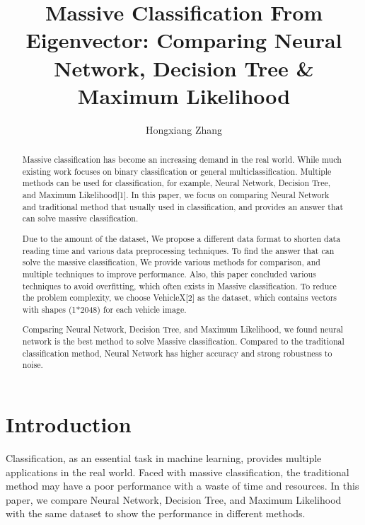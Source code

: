 \documentclass[runningheads]{llncs}
\begin{document}
\title{Massive Classification From Eigenvector: Comparing Neural Network,
	Decision Tree \& Maximum Likelihood}

\author{Hongxiang Zhang}


%
\maketitle
%
\begin{abstract}

Massive classification has become an increasing demand in the real world. While much existing work focuses on binary classification or general multiclassification. Multiple methods can be used for classification, for example, Neural Network, Decision Tree, and Maximum Likelihood[1]. In this paper, we focus on comparing Neural Network and traditional method that usually used in classification, and provides an answer that can solve massive classification.

Due to the amount of the dataset, We propose a different data format to shorten data reading time and various data preprocessing techniques. To find the answer that can solve the massive classification, We provide various methods for comparison, and multiple techniques to improve performance. Also, this paper concluded various techniques to avoid overfitting, which often exists in Massive classification. To reduce the problem complexity, we choose VehicleX[2] as the dataset, which contains vectors with shapes (1*2048) for each vehicle image. 

Comparing Neural Network, Decision Tree, and Maximum Likelihood, we found neural network is the best method to solve Massive classification. Compared to the traditional classification method, Neural Network has higher accuracy and strong robustness to noise.


\end{abstract}

\section{Introduction}

Classification, as an essential task in machine learning, provides multiple applications in the real world. Faced with massive classification, the traditional method may have a poor performance with a waste of time and resources. In this paper, we compare Neural Network, Decision Tree, and Maximum Likelihood with the same dataset to show the performance in different methods.
\end{document}
